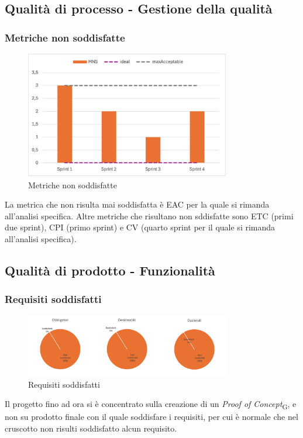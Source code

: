 \subsection{Qualità di processo - Gestione della qualità}
\subsubsection{Metriche non soddisfatte}
\begin{figure}[H]
    \centering
    \includegraphics[width=0.8\textwidth]{./images/MNS.png}
    \caption{Metriche non soddisfatte}
\end{figure}
La metrica che non risulta mai soddisfatta è EAC per la quale si rimanda all'analisi specifica. Altre metriche che risultano non sddisfatte sono ETC (primi due sprint), CPI (primo sprint) e CV (quarto sprint per il quale si rimanda all'analisi specifica).



\subsection{Qualità di prodotto - Funzionalità}
\subsubsection{Requisiti soddisfatti}
\begin{figure}[H]
    \centering
    \includegraphics[width=0.8\textwidth]{./images/requisitisoddisfatti.png}
    \caption{Requisiti soddisfatti}
\end{figure}
Il progetto fino ad ora si è concentrato sulla creazione di un \textit{Proof of Concept}\textsubscript{G}, e non su prodotto finale con il quale soddisfare i requisiti, per cui è normale che nel cruscotto non risulti soddisfatto alcun requisito.



